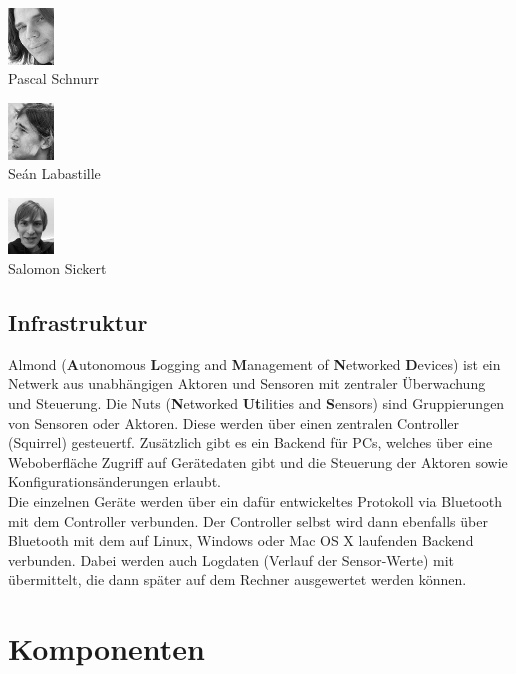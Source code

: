 \documentclass[12pt,a4paper]{article}
\begin{document}
\begin{multicols}{2}
{\begin{list}{ }
	\item    \includegraphics[height=1.5cm]{./face_Schnurrrr.png}  \\      Pascal Schnurr    
	\item    \includegraphics[height=1.5cm]{./face_Schon.png}      \\      Seán Labastille   
	\item    \includegraphics[height=1.5cm]{./face_Sickert.png}    \\      Salomon Sickert
\end{list}
}
\end{multicols}

\subsection{Infrastruktur}
Almond ({\bf A}utonomous {\bf L}ogging and {\bf M}anagement of {\bf N}etworked {\bf D}evices) ist ein Netwerk aus unabhängigen Aktoren und Sensoren mit zentraler Überwachung und Steuerung.
Die Nuts ({\bf N}etworked {\bf Ut}ilities and {\bf S}ensors) sind Gruppierungen von Sensoren oder Aktoren. Diese werden über einen zentralen Controller (Squirrel) gesteuertf. Zusätzlich gibt es ein Backend für PCs, welches über eine Weboberfläche Zugriff auf Gerätedaten gibt und die Steuerung der Aktoren sowie Konfigurationsänderungen erlaubt.\\
Die einzelnen Geräte werden über ein dafür entwickeltes Protokoll via Bluetooth mit dem Controller verbunden. Der Controller selbst wird dann ebenfalls über Bluetooth mit dem auf Linux, Windows oder Mac OS X laufenden Backend verbunden. Dabei werden auch Logdaten (Verlauf der Sensor-Werte) mit übermittelt, die dann später auf dem Rechner ausgewertet werden können.
\section{Komponenten}
\end{document}

